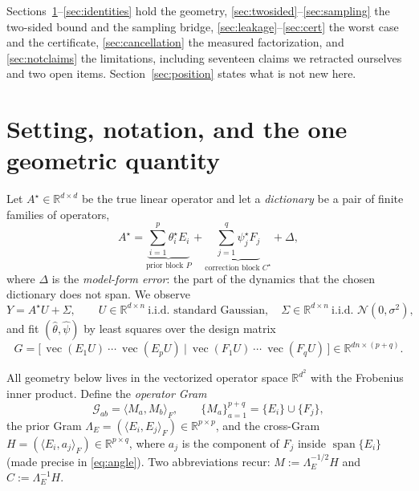 \documentclass[11pt]{article}
\theoremstyle{remark}
\newcommand{\Gr}{\mathcal{G}}
\newcommand{\Le}{\Lambda_E}
\begin{document}
\medskip
Sections~\ref{sec:setting}--\ref{sec:identities} hold the geometry,
\ref{sec:twosided}--\ref{sec:sampling} the two-sided bound and the sampling bridge,
\ref{sec:leakage}--\ref{sec:cert} the worst case and the certificate,
\ref{sec:cancellation} the measured factorization, and \ref{sec:notclaims} the
limitations, including seventeen claims we retracted ourselves and two open items.
Section~\ref{sec:position}
states what is not new here.

\section{Setting, notation, and the one geometric quantity}\label{sec:setting}

Let $A^\star\in\mathbb{R}^{d\times d}$ be the true linear operator and let a
\emph{dictionary} be a pair of finite families of operators,
\begin{equation}\label{eq:decomp}
  A^\star=\underbrace{\sum_{i=1}^{p}\theta_i^\star E_i}_{\text{prior block }P}
        +\underbrace{\sum_{j=1}^{q}\psi_j^\star F_j}_{\text{correction block }C^\star}
        +\Delta ,
\end{equation}
where $\Delta$ is the \emph{model-form error}: the part of the dynamics that the chosen
dictionary does not span. We observe
\begin{equation}\label{eq:data}
  Y=A^\star U+\Sigma,\qquad
  U\in\mathbb{R}^{d\times n}\ \text{i.i.d.\ standard Gaussian},\quad
  \Sigma\in\mathbb{R}^{d\times n}\ \text{i.i.d.\ } \mathcal N(0,\sigma^2),
\end{equation}
and fit $(\hat\theta,\hat\psi)$ by least squares over the design matrix
\begin{equation}\label{eq:design}
  G=\bigl[\,\operatorname{vec}(E_1U)\ \cdots\ \operatorname{vec}(E_pU)\ \big|\
          \operatorname{vec}(F_1U)\ \cdots\ \operatorname{vec}(F_qU)\,\bigr]
   \in\mathbb{R}^{dn\times(p+q)} .
\end{equation}

All geometry below lives in the vectorized operator space
$\mathbb{R}^{d^2}$ with the Frobenius inner product. Define the \emph{operator Gram}
\begin{equation}\label{eq:opgram}
  \Gr_{ab}=\langle M_a,M_b\rangle_F,\qquad \{M_a\}_{a=1}^{p+q}=\{E_i\}\cup\{F_j\},
\end{equation}
the prior Gram $\Le=(\langle E_i,E_j\rangle_F)\in\mathbb{R}^{p\times p}$, and the
cross-Gram $H=(\langle E_i,a_j\rangle_F)\in\mathbb{R}^{p\times q}$, where $a_j$ is the
component of $F_j$ inside $\operatorname{span}\{E_i\}$ (made precise in
\eqref{eq:angle}). Two abbreviations recur:
$M:=\Le^{-1/2}H$ and $C:=\Le^{-1}H$.
\end{document}
